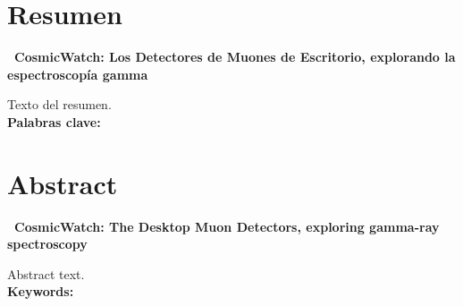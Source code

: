 \newpage
\chapter*{Resumen}
%
\textbf{\Huge \ CosmicWatch: Los Detectores de Muones de Escritorio, explorando la espectroscopía gamma}
\vspace{.5cm}
\par Texto del resumen.
\\[2cm]
\textbf{Palabras clave:} \palabrasclave

\newpage 
\chapter*{Abstract}
%
\textbf{\Huge \ CosmicWatch: The Desktop Muon Detectors, exploring gamma-ray spectroscopy}
\vspace{.5cm}
\par Abstract text.
\\[2cm]
\textbf{Keywords:} \keywords

